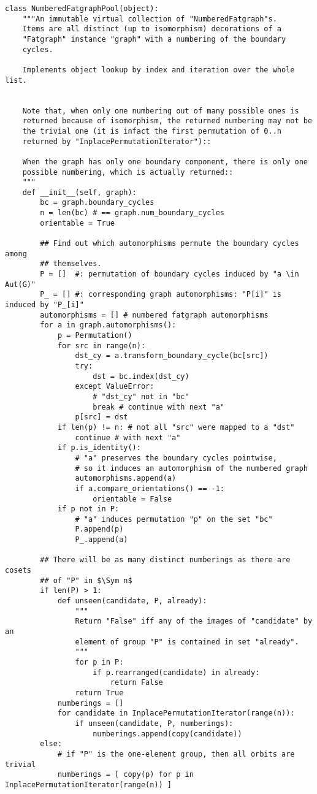 \begin{lstlisting}
class NumberedFatgraphPool(object):
    """An immutable virtual collection of "NumberedFatgraph"s.
    Items are all distinct (up to isomorphism) decorations of a
    "Fatgraph" instance "graph" with a numbering of the boundary
    cycles.

    Implements object lookup by index and iteration over the whole list.

       
    Note that, when only one numbering out of many possible ones is
    returned because of isomorphism, the returned numbering may not be
    the trivial one (it is infact the first permutation of 0..n
    returned by "InplacePermutationIterator")::

    When the graph has only one boundary component, there is only one
    possible numbering, which is actually returned::
    """
    def __init__(self, graph):
        bc = graph.boundary_cycles
        n = len(bc) # == graph.num_boundary_cycles
        orientable = True

        ## Find out which automorphisms permute the boundary cycles among
        ## themselves.
        P = []  #: permutation of boundary cycles induced by "a \in Aut(G)"
        P_ = [] #: corresponding graph automorphisms: "P[i]" is induced by "P_[i]"
        automorphisms = [] # numbered fatgraph automorphisms
        for a in graph.automorphisms():
            p = Permutation()
            for src in range(n):
                dst_cy = a.transform_boundary_cycle(bc[src])
                try:
                    dst = bc.index(dst_cy)
                except ValueError:
                    # "dst_cy" not in "bc"
                    break # continue with next "a"
                p[src] = dst
            if len(p) != n: # not all "src" were mapped to a "dst"
                continue # with next "a"
            if p.is_identity():
                # "a" preserves the boundary cycles pointwise,
                # so it induces an automorphism of the numbered graph
                automorphisms.append(a)
                if a.compare_orientations() == -1:
                    orientable = False
            if p not in P:
                # "a" induces permutation "p" on the set "bc"
                P.append(p)
                P_.append(a)

        ## There will be as many distinct numberings as there are cosets
        ## of "P" in $\Sym n$
        if len(P) > 1:
            def unseen(candidate, P, already):
                """
                Return "False" iff any of the images of "candidate" by an
                element of group "P" is contained in set "already".
                """
                for p in P:
                    if p.rearranged(candidate) in already:
                        return False
                return True
            numberings = []
            for candidate in InplacePermutationIterator(range(n)):
                if unseen(candidate, P, numberings):
                    numberings.append(copy(candidate))
        else:
            # if "P" is the one-element group, then all orbits are trivial
            numberings = [ copy(p) for p in InplacePermutationIterator(range(n)) ]


\end{lstlisting}
